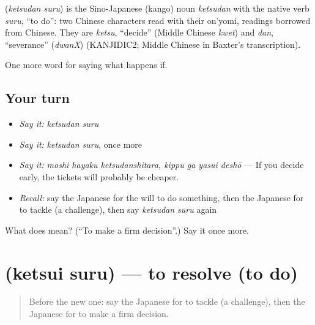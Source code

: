 \begin{cousinweb}
\textbf{} (\emph{ketsudan suru}) is the Sino-Japanese (kango) noun \emph{ketsudan} with the native verb \emph{suru}, \textquotedblleft{}to do\textquotedblright{}: two Chinese characters read with their on'yomi, readings borrowed from Chinese. They are \emph{ketsu}, \textquotedblleft{}decide\textquotedblright{} (Middle Chinese \emph{kwet}) and \emph{dan}, \textquotedblleft{}severance\textquotedblright{} (\emph{dwanX}) (KANJIDIC2; Middle Chinese in Baxter's transcription).
\end{cousinweb}

\begin{grammarlens}[title={What you've built}]
One more word for saying what happens if.
\end{grammarlens}

\subsection*{Your turn}
\begin{itemize}
\raggedright
  \item \emph{Say it:} \emph{ketsudan suru}
  \item \emph{Say it:} \emph{ketsudan suru}, once more
  \item \emph{Say it:} \emph{moshi hayaku ketsudanshitara, kippu ga yasui deshō} — If you decide early, the tickets will probably be cheaper.
  \item \emph{Recall:} say the Japanese for the will to do something, then the Japanese for to tackle (a challenge), then say \emph{ketsudan suru} again
\end{itemize}

\begin{tcolorbox}[breakable,colback=teal!4,colframe=teal!35!black,title={Before you move on}]
What does  mean? (\textquotedblleft{}To make a firm decision\textquotedblright{}.) Say it once more.
\end{tcolorbox}
\section[\texorpdfstring{\ja{けついする} (ketsui suru)}{けついする (ketsui suru)}]{ (ketsui suru) — to resolve (to do)}

\label{lesson:JA-C517-ketsui-suru}



\begin{quote}
Before the new one: say the Japanese for to tackle (a challenge), then the Japanese for to make a firm decision.
\end{quote}

